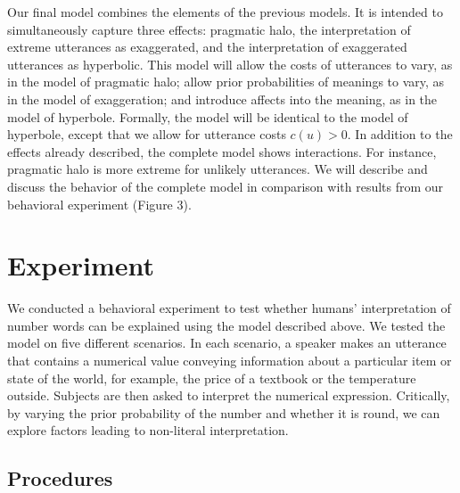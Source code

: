 \documentclass{article} %
\begin{document}
Our final model combines the elements of the previous models. It is intended to simultaneously capture three effects: pragmatic halo, the interpretation of extreme utterances as exaggerated, and the interpretation of exaggerated utterances as hyperbolic. This model will allow the costs of utterances to vary, as in the model of pragmatic halo; allow prior probabilities of meanings to vary, as in the model of exaggeration; and introduce affects into the meaning, as in the model of hyperbole. Formally, the model will be identical to the model of hyperbole, except that we allow for utterance costs $c(u) > 0$. In addition to the effects already described, the complete model shows interactions. For instance, pragmatic halo is more extreme for unlikely utterances. We will describe and discuss the behavior of the complete model in comparison with results from our behavioral experiment (Figure 3).




\section{Experiment}

We conducted a behavioral experiment to test whether humans' interpretation of number words can be explained using the model described above. We tested the model on five different scenarios. In each scenario, a speaker makes an utterance that contains a numerical value conveying information about a particular item or state of the world, for example, the price of a textbook or the temperature outside. Subjects are then asked to interpret the numerical expression. Critically, by varying the prior probability of the number and whether it is round, we can explore factors leading to non-literal interpretation.

\subsection{Procedures}
\end{document}
